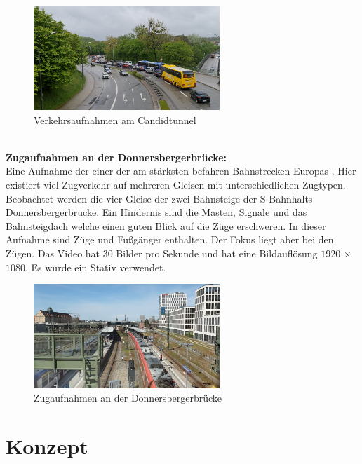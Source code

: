 \documentclass[conference]{IEEEtran}
\begin{document}
	\begin{figure}[!h]
		\begin{center}
			\includegraphics[width=7cm]{Media/CandidRaw.png}
			\caption{Verkehrsaufnahmen am Candidtunnel}
			\label{CandidtunnelRaw}
		\end{center}
	\end{figure}\\
	\textbf{Zugaufnahmen an der Donnersbergerbrücke:}\\
	Eine Aufnahme der einer der am stärksten befahren Bahnstrecken Europas \cite{z1}. Hier existiert viel Zugverkehr auf mehreren Gleisen mit unterschiedlichen Zugtypen. Beobachtet werden die vier Gleise der zwei Bahnsteige der S-Bahnhalts Donnersbergerbrücke. Ein Hindernis sind die Masten, Signale und das Bahnsteigdach welche einen guten Blick auf die Züge erschweren. In dieser Aufnahme sind Züge und Fußgänger enthalten. Der Fokus liegt aber bei den Zügen. Das Video hat 30 Bilder pro Sekunde und hat eine Bildauflösung $1920$ × $1080$. Es wurde ein Stativ verwendet.
	\begin{figure}[!h]
		\begin{center}
			\includegraphics[width=7cm]{Media/DonnersbergerRaw.png}
			\caption{Zugaufnahmen an der Donnersbergerbrücke}
			\label{DonnersbergerRaw}
		\end{center}
	\end{figure}
	
	\section{Konzept}
	
\end{document}
